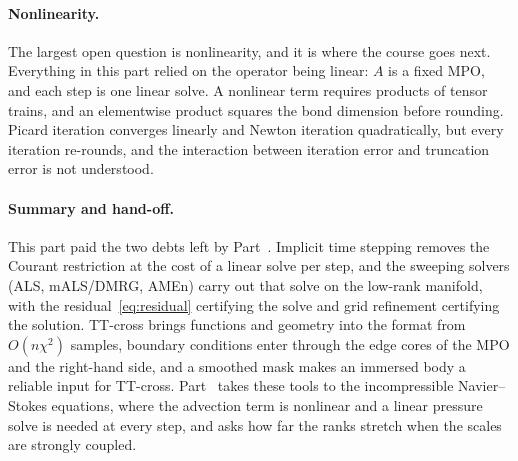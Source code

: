 \paragraph{Nonlinearity.}
The largest open question is nonlinearity, and it is where the course goes next.
Everything in this part relied on the operator being linear: $A$ is a fixed MPO,
and each step is one linear solve. A nonlinear term requires products of tensor
trains, and an elementwise product squares the bond dimension before rounding.
Picard iteration converges linearly and Newton iteration quadratically, but every
iteration re-rounds, and the interaction between iteration error and truncation
error is not understood.

\paragraph{Summary and hand-off.}
This part paid the two debts left by Part~. Implicit time stepping
removes the Courant restriction at the cost of a linear solve per step, and the
sweeping solvers (ALS, mALS/DMRG, AMEn) carry out that solve on the low-rank
manifold, with the residual~\eqref{eq:residual} certifying the solve and grid
refinement certifying the solution. TT-cross brings functions and geometry into
the format from $O(n\chi^2)$ samples, boundary conditions enter through the edge
cores of the MPO and the right-hand side, and a smoothed mask makes an immersed
body a reliable input for TT-cross. Part~ takes these tools to the
incompressible Navier--Stokes equations, where the advection term is nonlinear
and a linear pressure solve is needed at every step, and asks how far the ranks
stretch when the scales are strongly coupled.

